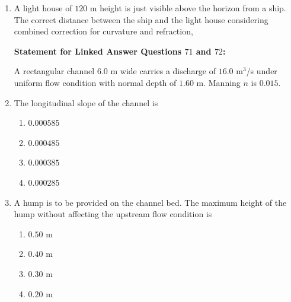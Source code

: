 \documentclass[journal]{IEEEtran}
\begin{document}
\begin{enumerate}
\item A light house of $120$ m height is just visible above the horizon from a ship. The correct distance  between the ship and the light house considering combined correction for curvature and refraction, \hfill {}
\begin{enumerate}
\end{enumerate}

\vspace{0.5cm}

\textbf{Statement for Linked Answer Questions $71$ and $72$:}


A rectangular channel $6.0$ m wide carries a discharge of $16.0$ m$^3$/s under uniform flow condition with normal depth of $1.60$ m. Manning $n$ is $0.015$. 

\vspace{0.5cm}

\item The longitudinal slope of the channel is \hfill {}

\begin{enumerate}
\item $0.000585$
\item $0.000485$
\item $0.000385$
\item $0.000285$
\end{enumerate}

\vspace{0.3cm}

\item A hump is to be provided on the channel bed. The maximum height of the hump without affecting the upstream flow condition is \hfill {}

\begin{enumerate}
\item $0.50$ m
\item $0.40$ m
\item $0.30$ m
\item $0.20$ m
\end{enumerate}

\vspace{0.3cm}


\end{enumerate}
\end{document}
